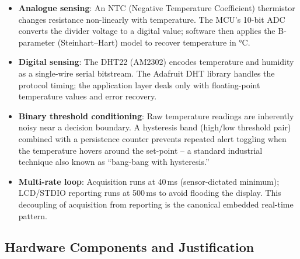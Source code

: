 \documentclass[12pt]{article}
\begin{document}
\begin{itemize}
    \item \textbf{Analogue sensing}: An NTC (Negative Temperature Coefficient) thermistor changes resistance non-linearly with temperature. The MCU's 10-bit ADC converts the divider voltage to a digital value; software then applies the B-parameter (Steinhart--Hart) model to recover temperature in °C.
    \item \textbf{Digital sensing}: The DHT22 (AM2302) encodes temperature and humidity as a single-wire serial bitstream. The Adafruit DHT library handles the protocol timing; the application layer deals only with floating-point temperature values and error recovery.
    \item \textbf{Binary threshold conditioning}: Raw temperature readings are inherently noisy near a decision boundary. A hysteresis band (high/low threshold pair) combined with a persistence counter prevents repeated alert toggling when the temperature hovers around the set-point -- a standard industrial technique also known as ``bang-bang with hysteresis.''
    \item \textbf{Multi-rate loop}: Acquisition runs at 40\,ms (sensor-dictated minimum); LCD/STDIO reporting runs at 500\,ms to avoid flooding the display. This decoupling of acquisition from reporting is the canonical embedded real-time pattern.
\end{itemize}

\subsection{Hardware Components and Justification}
\end{document}
